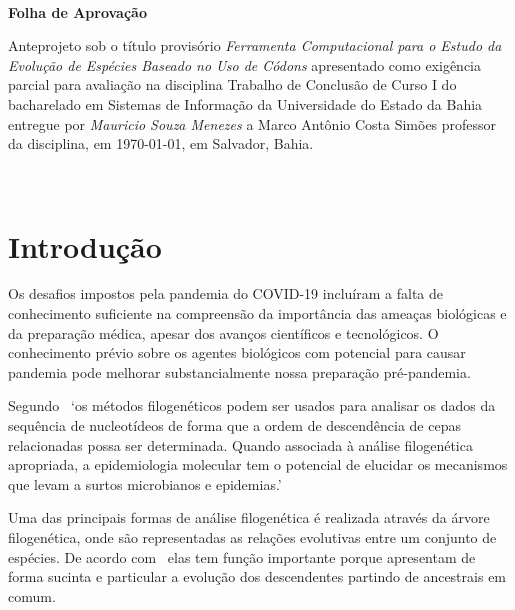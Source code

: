 \documentclass[font=plain]{abnt}
\begin{document}
\capa\
\folhaderosto\
\begin{folhadeaprovacao}
    \begin{center}
        \large
        \textbf{Folha de Aprovação}
    \end{center}

    Anteprojeto sob o título provisório \textit{Ferramenta Computacional para o Estudo da Evolução de Espécies Baseado no Uso de Códons} apresentado como exigência parcial para avaliação na disciplina Trabalho de Conclusão de Curso I do bacharelado em Sistemas de Informação da Universidade do Estado da Bahia entregue por \textit{Mauricio Souza Menezes} a Marco Antônio Costa Simões professor da disciplina, em \today, em Salvador, Bahia.
    \setlength{\ABNTsignthickness}{0.4pt}
    \setlength{\ABNTsignskip}{2cm}
    \hspace*{1cm}
    \hspace*{1cm}
    \assinatura{Diego Gervasio Frias Suárez}
\end{folhadeaprovacao}




\sumario\


\chapter{Introdução}

Os desafios impostos pela pandemia do COVID-19 incluíram a falta de conhecimento suficiente na compreensão da importância das ameaças biológicas e da preparação médica, apesar dos avanços científicos e tecnológicos. O conhecimento prévio sobre os agentes biológicos com potencial para causar pandemia pode melhorar substancialmente nossa preparação pré-pandemia.~\cite[p. 1]{behl_threat_2022}

Segundo~\cite[p.1]{barry_phylogenetic_analysis_2006} `os métodos filogenéticos podem ser usados para analisar os dados da sequência de nucleotídeos de forma que a ordem de descendência de cepas relacionadas possa ser determinada. Quando associada à análise filogenética apropriada, a epidemiologia molecular tem o potencial de elucidar os mecanismos que levam a surtos microbianos e epidemias.'

Uma das principais formas de análise filogenética é realizada através da árvore filogenética, onde são representadas as relações evolutivas entre um conjunto de espécies. De acordo com~\cite{morrison_tree_thinking} elas tem função importante porque apresentam de forma sucinta e particular a evolução dos descendentes partindo de ancestrais em comum.
\end{document}
